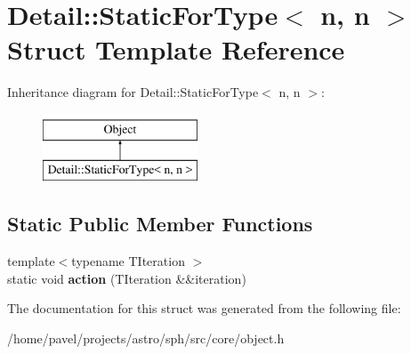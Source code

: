 \hypertarget{structDetail_1_1StaticForType_3_01n_00_01n_01_4}{}\section{Detail\+:\+:Static\+For\+Type$<$ n, n $>$ Struct Template Reference}
\label{structDetail_1_1StaticForType_3_01n_00_01n_01_4}
Inheritance diagram for Detail\+:\+:Static\+For\+Type$<$ n, n $>$\+:\begin{figure}[H]
\begin{center}
\leavevmode
\includegraphics[height=2.000000cm]{structDetail_1_1StaticForType_3_01n_00_01n_01_4}
\end{center}
\end{figure}
\subsection*{Static Public Member Functions}
\begin{DoxyCompactItemize}
\item 
\hypertarget{structDetail_1_1StaticForType_3_01n_00_01n_01_4_a109e33c67364b50a8d551b7c57da2faf}{}\label{structDetail_1_1StaticForType_3_01n_00_01n_01_4_a109e33c67364b50a8d551b7c57da2faf} 
{\footnotesize template$<$typename T\+Iteration $>$ }\\static void {\bfseries action} (T\+Iteration \&\&iteration)
\end{DoxyCompactItemize}


The documentation for this struct was generated from the following file\+:\begin{DoxyCompactItemize}
\item 
/home/pavel/projects/astro/sph/src/core/object.\+h\end{DoxyCompactItemize}
